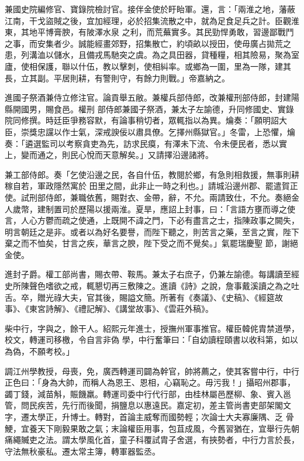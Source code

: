 \begin{pinyinscope}
 兼國史院編修官、寶錄院檢討官。接伴金使於盱眙軍。還，言：「兩淮之地，藩蔽江南，干戈盜賊之後，宜加經理，必於招集流散之中，就為足食足兵之計。臣觀淮東，其地平博膏腴，有陂澤水泉
 之利，而荒蕪實多。其民勁悍勇敢，習邊鄙戰鬥之事，而安集者少。誠能經畫郊野，招集散亡，約頃畝以授田，使毋廣占拋荒之患，列溝洫以儲水，且備戎馬馳突之虞。為之具田器，貸種糧，相其險易，聚為室廬，使相保護，聯以什伍，教以擊刺，使相糾率。或鄉為一圍，里為一隊，建其長，立其副。平居則耕，有警則守，有餘力則戰。」帝嘉納之。



 進國子祭酒兼侍立修注官。論貢舉五敝。兼權兵部侍郎，改兼權刑部侍郎，封建陽縣開國男，賜食邑。權刑
 部侍郎兼國子祭酒，兼太子左諭德，升同修國史、實錄院同修撰。時廷臣爭務容默，有論事稍切者，眾輒指以為異。爚奏：「願明詔大臣，崇獎忠讜以作士氣，深戒諛佞以肅具僚。乞擇州縣獄官。」冬雷，上恐懼，爚奏：「遴選監司以考察貪吏為先，訪求民瘼，有澤未下流、令未便民者，悉以實上，變而通之，則民心悅而天意解矣。」又請擇沿邊諸將。



 兼工部侍郎。奏「乞使沿邊之民，各自什伍，教閱於鄉，有急則相救援，無事則耕稼自若，軍政隱然寓於
 田里之間，此非止一時之利也。」請城沿邊州郡、罷遣賀正使。試刑部侍郎，兼職依舊，賜對衣、金帶，辭，不允。兩請致仕，不允。奏絕金人歲幣，建制置司於歷陽以援兩淮。夏旱，應詔上封事，曰：「言語方壅而導之使言，人心方鬱而疏之使通，上既開不諱之門，下必有盡言之士，指陳政事之闕失，明言朝廷之是非。或者以為好名要譽，而陛下聽之，則苦言之藥，至言之實，陛下棄之而不恤矣，甘言之疾，華言之腴，陛下受之而不覺矣。」氣罷瑞慶聖
 節，謝絕金使。



 進封子爵。權工部尚書，賜衣帶、鞍馬。兼太子右庶子，仍兼左諭德。每講讀至經史所陳聲色嗜欲之戒，輒懇切再三敷陳之。進讀《詩》之說，詹事戴溪讀之為之吐舌。卒，贈光祿大夫，官其後，賜謚文簡。所著有《奏議》、《史稿》、《經筵故事》、《東宮詩解》、《禮記解》、《講堂故事》、《雲莊外稿》。



 柴中行，字與之，餘干人。紹熙元年進士，授撫州軍事推官。權臣韓侂胄禁道學，校文，轉運司移檄，令自言非偽
 學，中行奮筆曰：「自幼讀程頤書以收科第，如以為偽，不願考校。」



 調江州學教授，母喪，免，廣西轉運司闢為幹官，帥將薦之，使其客嘗中行，中行正色曰：「身為大帥，而稱人為恩王、恩相，心竊恥之。毋污我！」攝昭州郡事，蠲丁錢，減苗斛，賑饑羸。轉運司委中行代行部，由桂林屬邑歷柳、象、賓入邕管，問民疾苦，先行而後聞，捐鹽息以惠遠民。嘉定初，差主管尚書吏部架閣文字，遷太學正，升博士。轉對，首論主威奪而國勢輕；次論士大夫寡廉隅、乏
 骨鯁，宜養天下剛毅果敢之氣；末論權臣用事，包苴成風，今舊習猶在，宜舉行先朝痛繩贓吏之法。謂太學風化首，童子科覆試胄子舍選，有挾勢者，中行力言於長，守法無秋豪私。遷太常主簿，轉軍器監丞。




\end{pinyinscope}
